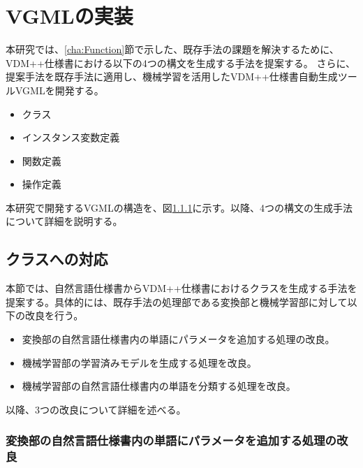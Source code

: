 \chapter{VGMLの実装}\label{cha:Implementation}

本研究では、\ref{cha:Function}節で示した、既存手法の課題を解決するために、VDM++仕様書における以下の4つの構文を生成する手法を提案する。
さらに、提案手法を既存手法に適用し、機械学習を活用したVDM++仕様書自動生成ツールVGMLを開発する。

\begin{itemize}
    \item クラス
    \item インスタンス変数定義
    \item 関数定義
    \item 操作定義
\end{itemize}

本研究で開発するVGMLの構造を、図\ref{}に示す。以降、4つの構文の生成手法について詳細を説明する。

\section{クラスへの対応}
本節では、自然言語仕様書からVDM++仕様書におけるクラスを生成する手法を提案する。具体的には、既存手法の処理部である変換部と機械学習部に対して以下の改良を行う。

\begin{itemize}
    \item 変換部の自然言語仕様書内の単語にパラメータを追加する処理の改良。
    \item 機械学習部の学習済みモデルを生成する処理を改良。
    \item 機械学習部の自然言語仕様書内の単語を分類する処理を改良。
\end{itemize}

以降、3つの改良について詳細を述べる。

\subsection{変換部の自然言語仕様書内の単語にパラメータを追加する処理の改良}

